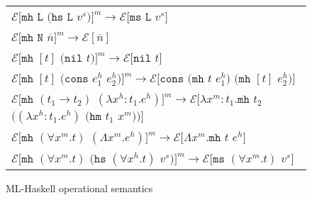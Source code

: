 \begin{figure}[p]
\centering
\begin{tabular}{l}

$\mathscr{E}[\mathtt{mh}$ $\mathtt{L}$ $(\mathtt{hs}$ $\mathtt{L}$ $v^s)]^m\rightarrow\mathscr{E}[\mathtt{ms}$ $\mathtt{L}$ $v^s]$ \\

$\mathscr{E}[\mathtt{mh}$ $\mathtt{N}$ $\overline{n}]^m\rightarrow\mathscr{E}[\overline{n}]$ \\

$\mathscr{E}[\mathtt{mh}$ $[t]$ $(\mathtt{nil}$ $t)]^m\rightarrow\mathscr{E}[\mathtt{nil}$ $t]$ \\

$\mathscr{E}[\mathtt{mh}$ $[t]$ $(\mathtt{cons}$ $e^h_1$ $e^h_2)]^m\rightarrow\mathscr{E}[\mathtt{cons}$ $(\mathtt{mh}$ $t$ $e^h_1)$ $(\mathtt{mh}$ $[t]$ $e^h_2)]$ \\

$\mathscr{E}[\mathtt{mh}$ $(t_1\rightarrow t_2)$ $(\lambda x^h:t_1.e^h)]^m\rightarrow\mathscr{E}[\lambda x^m:t_1.\mathtt{mh}$ $t_2$ $((\lambda x^h:t_1.e^h)$ $(\mathtt{hm}$ $t_1$ $x^m))]$ \\

$\mathscr{E}[\mathtt{mh}$ $(\forall x^m.t)$ $(\Lambda x^m.e^h)]^m\rightarrow\mathscr{E}[\Lambda x^m.\mathtt{mh}$ $t$ $e^h]$ \\

$\mathscr{E}[\mathtt{mh}$ $(\forall x^m.t)$ $(\mathtt{hs}$ $(\forall x^h.t)$ $v^s)]^m\rightarrow\mathscr{E}[\mathtt{ms}$ $(\forall x^m.t)$ $v^s]$ \\

\end{tabular}
\caption{ML-Haskell operational semantics}
\label{mhos}
\end{figure}